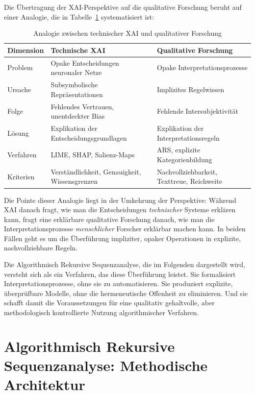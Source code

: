 \documentclass[
  12pt,
  a4paper,
  oneside,
  titlepage
]{article}
\begin{document}
Die Übertragung der XAI-Perspektive auf die qualitative Forschung beruht auf einer 
Analogie, die in Tabelle~\ref{tab:analogie} systematisiert ist:

\begin{table}[h]
\centering
\caption{Analogie zwischen technischer XAI und qualitativer Forschung}
\label{tab:analogie}
\begin{tabular}{@{} p{2.5cm} p{5cm} p{5cm} @{}}
\toprule
\textbf{Dimension} & \textbf{Technische XAI} & \textbf{Qualitative Forschung} \\
\midrule
Problem & Opake Entscheidungen neuronaler Netze & Opake Interpretationsprozesse \\
Ursache & Subsymbolische Repräsentationen & Implizites Regelwissen \\
Folge & Fehlendes Vertrauen, unentdeckter Bias & Fehlende Intersubjektivität \\
Lösung & Explikation der Entscheidungsgrundlagen & Explikation der Interpretationsregeln \\
Verfahren & LIME, SHAP, Salienz-Maps & ARS, explizite Kategorienbildung \\
Kriterien & Verständlichkeit, Genauigkeit, Wissensgrenzen & Nachvollziehbarkeit, Texttreue, Reichweite \\
\bottomrule
\end{tabular}
\end{table}

Die Pointe dieser Analogie liegt in der Umkehrung der Perspektive: Während XAI danach 
fragt, wie man die Entscheidungen \textit{technischer} Systeme erklären kann, fragt 
eine erklärbare qualitative Forschung danach, wie man die Interpretationsprozesse 
\textit{menschlicher} Forscher erklärbar machen kann. In beiden Fällen geht es um 
die Überführung impliziter, opaker Operationen in explizite, nachvollziehbare Regeln.

Die Algorithmisch Rekursive Sequenzanalyse, die im Folgenden dargestellt wird, 
versteht sich als ein Verfahren, das diese Überführung leistet. Sie formalisiert 
Interpretationsprozesse, ohne sie zu automatisieren. Sie produziert explizite, 
überprüfbare Modelle, ohne die hermeneutische Offenheit zu eliminieren. Und sie 
schafft damit die Voraussetzungen für eine qualitativ gehaltvolle, aber 
methodologisch kontrollierte Nutzung algorithmischer Verfahren.

\section{Algorithmisch Rekursive Sequenzanalyse: Methodische Architektur}
\end{document}
